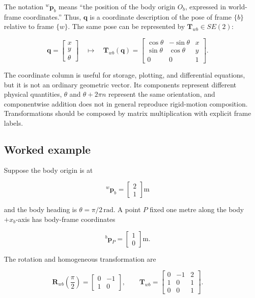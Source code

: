 \documentclass[
  australian,
  12pt,
  letterpaper,
  DIV=11,
  numbers=noendperiod,
  twoside]{scrreprt}
\begin{document}
The notation \({}^w\mathbf p_b\) means ``the position of the body origin
\(O_b\), expressed in world-frame coordinates.'' Thus, \(\mathbf q\) is
a coordinate description of the pose of frame \(\{b\}\) relative to
frame \(\{w\}\). The same pose can be represented by
\(\mathbf T_{wb}\in SE(2)\):

\[
\boxed{
\mathbf q
=
\begin{bmatrix}
x\\y\\\theta
\end{bmatrix}
\quad\longmapsto\quad
\mathbf T_{wb}(\mathbf q)
=
\begin{bmatrix}
\cos\theta&-\sin\theta&x\\
\sin\theta&\cos\theta&y\\
0&0&1
\end{bmatrix}
}.
\]

The coordinate column is useful for storage, plotting, and differential
equations, but it is not an ordinary geometric vector. Its components
represent different physical quantities, \(\theta\) and
\(\theta+2\pi n\) represent the same orientation, and componentwise
addition does not in general reproduce rigid-motion composition.
Transformations should be composed by matrix multiplication with
explicit frame labels.

\subsection{Worked example}\label{worked-example}

Suppose the body origin is at

\[
{}^{w}\mathbf p_b
=
\begin{bmatrix}
2\\1
\end{bmatrix}
\mathrm m
\]

and the body heading is \(\theta=\pi/2\,\mathrm{rad}\). A point \(P\)
fixed one metre along the body \(+x_b\)-axis has body-frame coordinates

\[
{}^{b}\mathbf p_P
=
\begin{bmatrix}
1\\0
\end{bmatrix}
\mathrm m.
\]

The rotation and homogeneous transformation are

\[
\mathbf R_{wb}\left(\frac{\pi}{2}\right)
=
\begin{bmatrix}
0&-1\\
1&0
\end{bmatrix},
\qquad
\mathbf T_{wb}
=
\begin{bmatrix}
0&-1&2\\
1&0&1\\
0&0&1
\end{bmatrix}.
\]
\end{document}
